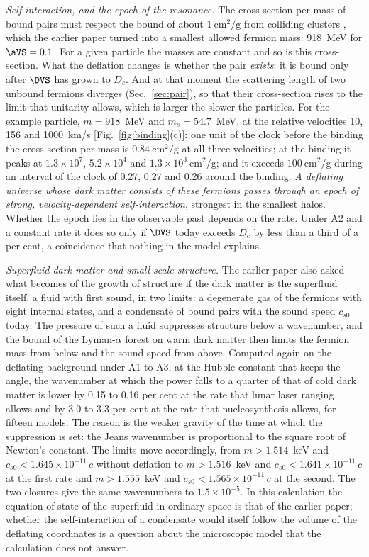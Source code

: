 \emph{Self-interaction, and the epoch of the resonance.} The cross-section per mass of bound pairs
must respect the bound of about $1~\mathrm{cm^{2}/g}$ from colliding clusters
\cite{Markevitch2004,Randall2008}, which the earlier paper turned into a smallest allowed fermion
mass: 918~MeV for $\aVS=0.1$. For a given particle the masses are constant and so is this
cross-section. What the deflation changes is whether the pair \emph{exists}: it is bound only after
$\DVS$ has grown to $D_c$. And at that moment the scattering length of two unbound fermions
diverges (Sec.~\ref{sec:pair}), so that their cross-section rises to the limit that unitarity
allows, which is larger the slower the particles. For the example particle, $m=918$~MeV and
$m_s=54.7$~MeV, at the relative velocities 10, 156 and 1000~km/s [Fig.~\ref{fig:binding}(c)]: one
unit of the clock before the binding the cross-section per mass is $0.84~\mathrm{cm^{2}/g}$ at all
three velocities; at the binding it peaks at $1.3\times10^{7}$, $5.2\times10^{4}$ and
$1.3\times10^{3}~\mathrm{cm^{2}/g}$; and it exceeds $100~\mathrm{cm^{2}/g}$ during an interval of the
clock of 0.27, 0.27 and 0.26 around the binding. \emph{A deflating universe whose dark matter
consists of these fermions passes through an epoch of strong, velocity-dependent self-interaction},
strongest in the smallest halos. Whether the epoch lies in the observable past depends on the rate.
Under A2 and a constant rate it does so only if $\DVS$ today exceeds $D_c$ by less than a third of a
per cent, a coincidence that nothing in the model explains.

\emph{Superfluid dark matter and small-scale structure.} The earlier paper also asked what becomes
of the growth of structure if the dark matter is the superfluid itself, a fluid with first sound, in
two limits: a degenerate gas of the fermions with eight internal states, and a condensate of bound
pairs with the sound speed $c_{s0}$ today. The pressure of such a fluid suppresses structure below a
wavenumber, and the bound of the Lyman-$\alpha$ forest on warm dark matter
\cite{Viel2005,Irsic2017} then limits the fermion mass from below and the sound speed from above.
Computed again on the deflating background under A1 to A3, at the Hubble constant that keeps the
angle, the wavenumber at which the power falls to a quarter of that of cold dark matter is lower by
0.15 to 0.16 per cent at the rate that lunar laser ranging allows and by 3.0 to 3.3 per cent at the
rate that nucleosynthesis allows, for fifteen models. The reason is the weaker gravity of the time
at which the suppression is set: the Jeans wavenumber is proportional to the square root of Newton's
constant. The limits move accordingly, from $m>1.514$~keV and $c_{s0}<1.645\times10^{-11}\,c$ without
deflation to $m>1.516$~keV and $c_{s0}<1.641\times10^{-11}\,c$ at the first rate and $m>1.555$~keV
and $c_{s0}<1.565\times10^{-11}\,c$ at the second. The two closures give the same wavenumbers to
$1.5\times10^{-5}$. In this calculation the equation of state of the superfluid in ordinary space is
that of the earlier paper; whether the self-interaction of a condensate would itself follow the
volume of the deflating coordinates is a question about the microscopic model that the calculation
does not answer.

